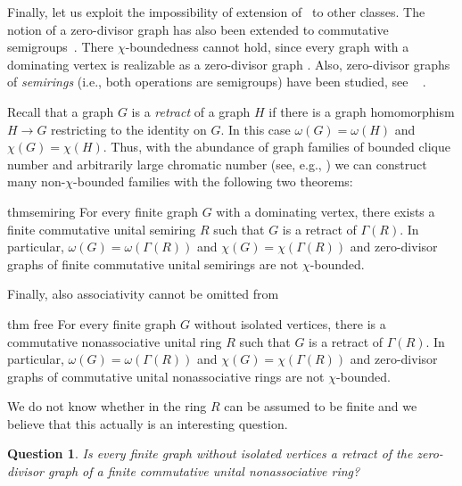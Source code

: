 \documentclass[a4paper,11pt]{amsart}
\newtheorem{ques}[ques]{Question}
\theoremstyle{definition}
\begin{document}
Finally, let us exploit the impossibility of extension of~ to other classes.
The notion of a zero-divisor graph has also been extended to commutative
semigroups~\cite{DMS02,AB17}. There $\chi$-boundedness
cannot hold, since every graph with a dominating vertex is realizable as a
zero-divisor graph \cite[Theorem~3]{DD05}.
Also, zero-divisor
graphs of \emph{semirings} (i.e., both operations are semigroups) have been studied, see ~ \cite{DolzanOblak12}. 

Recall that a graph $G$ is a \emph{retract} of a graph $H$ if there is a graph homomorphism $H\to G$ restricting to the identity on $G$. In this case $\omega(G)=\omega(H)$ and $\chi(G)=\chi(H)$. Thus, with the abundance of graph families of bounded clique number and arbitrarily large chromatic number (see, e.g., \cite{ScottSeymour20,Reiher26}) we can construct many non-$\chi$-bounded families with the following two theorems:
 
\begin{restatable}{thm}{semiring}\label{thm:semiring-retract}
For every finite graph $G$ with a dominating vertex, there exists a finite
commutative unital semiring $R$ such that $G$ is a
retract of $\Gamma(R)$.  In particular, $\omega(G) = \omega(\Gamma(R))$ and $\chi(G) = \chi(\Gamma(R))$ and zero-divisor graphs of finite commutative unital semirings are not $\chi$-bounded.
\end{restatable}



Finally, also associativity cannot be omitted from~

\begin{restatable}{thm}
{free}\label{prop:free-realization}
For every finite graph $G$ without isolated vertices, there is a commutative nonassociative unital ring $R$ such that $G$ is a {retract} of $\Gamma(R)$.   In particular, $\omega(G) = \omega(\Gamma(R))$ and $\chi(G) = \chi(\Gamma(R))$ and zero-divisor graphs of commutative unital nonassociative rings are not $\chi$-bounded.
\end{restatable}

We do not know whether in  the ring $R$ can be assumed to be finite and we believe that this actually is an interesting question. 

\begin{ques}
Is every finite graph without isolated vertices a retract of the zero-divisor graph of a finite commutative unital nonassociative ring?
\end{ques}
\end{document}
